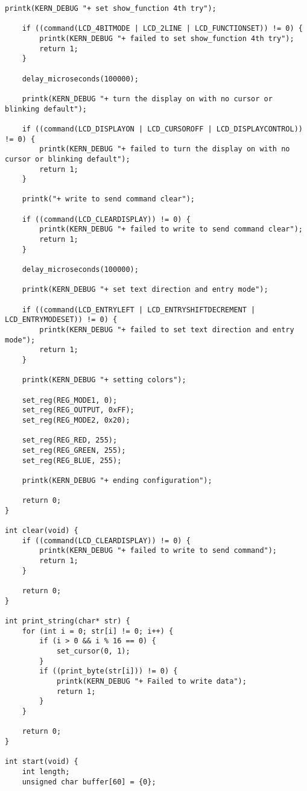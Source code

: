 \begin{appendices}
\begin{lstlisting}[label=driver,caption=Код модуля ядра~---~драйвера символьного дисплея]
    printk(KERN_DEBUG "+ set show_function 4th try");

    if ((command(LCD_4BITMODE | LCD_2LINE | LCD_FUNCTIONSET)) != 0) {
        printk(KERN_DEBUG "+ failed to set show_function 4th try");
        return 1;
    }

    delay_microseconds(100000);

    printk(KERN_DEBUG "+ turn the display on with no cursor or blinking default");

    if ((command(LCD_DISPLAYON | LCD_CURSOROFF | LCD_DISPLAYCONTROL)) != 0) {
        printk(KERN_DEBUG "+ failed to turn the display on with no cursor or blinking default");
        return 1;
    }

    printk("+ write to send command clear");

    if ((command(LCD_CLEARDISPLAY)) != 0) {
        printk(KERN_DEBUG "+ failed to write to send command clear");
        return 1;
    }

    delay_microseconds(100000);

    printk(KERN_DEBUG "+ set text direction and entry mode");

    if ((command(LCD_ENTRYLEFT | LCD_ENTRYSHIFTDECREMENT | LCD_ENTRYMODESET)) != 0) {
        printk(KERN_DEBUG "+ failed to set text direction and entry mode");
        return 1;
    }

    printk(KERN_DEBUG "+ setting colors");

    set_reg(REG_MODE1, 0);
    set_reg(REG_OUTPUT, 0xFF);
    set_reg(REG_MODE2, 0x20);

    set_reg(REG_RED, 255);
    set_reg(REG_GREEN, 255);
    set_reg(REG_BLUE, 255);

    printk(KERN_DEBUG "+ ending configuration");

    return 0;
}

int clear(void) {
    if ((command(LCD_CLEARDISPLAY)) != 0) {
        printk(KERN_DEBUG "+ failed to write to send command");
        return 1;
    }

    return 0;
}

int print_string(char* str) {
    for (int i = 0; str[i] != 0; i++) {
        if (i > 0 && i % 16 == 0) {
            set_cursor(0, 1);
        }
        if ((print_byte(str[i])) != 0) {
            printk(KERN_DEBUG "+ Failed to write data");
            return 1;
        }
    }

    return 0;
}

int start(void) {
    int length;
    unsigned char buffer[60] = {0};


\end{lstlisting}
\end{appendices}
